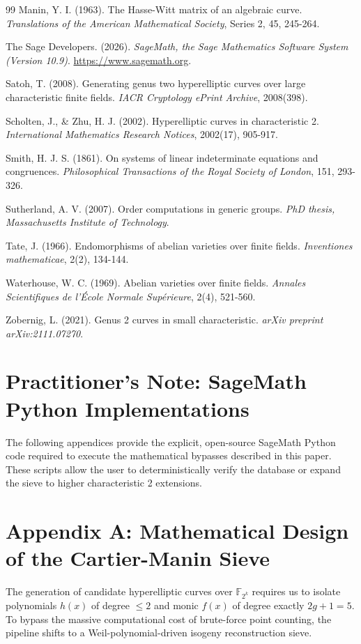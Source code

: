 \documentclass[letterpaper, 11pt]{article}
\begin{document}
\begin{thebibliography}{99}
Manin, Y. I. (1963). The Hasse-Witt matrix of an algebraic curve. \textit{Translations of the American Mathematical Society}, Series 2, 45, 245-264.

The Sage Developers. (2026). \textit{SageMath, the Sage Mathematics Software System (Version 10.9)}. \url{https://www.sagemath.org}.

Satoh, T. (2008). Generating genus two hyperelliptic curves over large characteristic finite fields. \textit{IACR Cryptology ePrint Archive}, 2008(398).

Scholten, J., \& Zhu, H. J. (2002). Hyperelliptic curves in characteristic 2. \textit{International Mathematics Research Notices}, 2002(17), 905-917.

Smith, H. J. S. (1861). On systems of linear indeterminate equations and congruences. \textit{Philosophical Transactions of the Royal Society of London}, 151, 293-326.

Sutherland, A. V. (2007). Order computations in generic groups. \textit{PhD thesis, Massachusetts Institute of Technology}.

Tate, J. (1966). Endomorphisms of abelian varieties over finite fields. \textit{Inventiones mathematicae}, 2(2), 134-144.

Waterhouse, W. C. (1969). Abelian varieties over finite fields. \textit{Annales Scientifiques de l'\'{E}cole Normale Sup\'{e}rieure}, 2(4), 521-560.

Zobernig, L. (2021). Genus 2 curves in small characteristic. \textit{arXiv preprint arXiv:2111.07270}.

\end{thebibliography}

\appendix
\section*{Practitioner's Note: SageMath Python Implementations}
The following appendices provide the explicit, open-source SageMath \cite{SageMath2026} Python code required to execute the mathematical bypasses described in this paper. These scripts allow the user to deterministically verify the database or expand the sieve to higher characteristic 2 extensions.

\section{Appendix A: Mathematical Design of the Cartier-Manin Sieve}
The generation of candidate hyperelliptic curves over $\mathbb{F}_{2^k}$ requires us to isolate polynomials $h(x)$ of degree $\le 2$ and monic $f(x)$ of degree exactly $2g+1=5$. To bypass the massive computational cost of brute-force point counting, the pipeline shifts to a Weil-polynomial-driven isogeny reconstruction sieve. 
\end{document}
